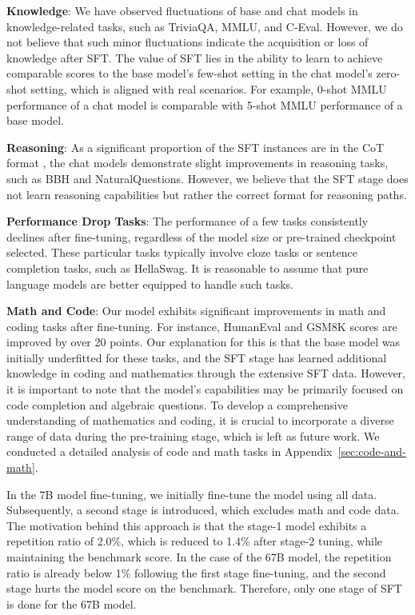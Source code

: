 \textbf{Knowledge}: We have observed fluctuations of base and chat models in knowledge-related tasks, such as TriviaQA, MMLU, and C-Eval. However, we do not believe that such minor fluctuations indicate the acquisition or loss of knowledge after SFT. The value of SFT lies in the ability to learn to achieve comparable scores to the base model's few-shot setting in the chat model's zero-shot setting, which is aligned with real scenarios. For example, 0-shot MMLU performance of a chat model is comparable with 5-shot MMLU performance of a base model. 

\textbf{Reasoning}: As a significant proportion of the SFT instances are in the CoT format \cite{cot}, the chat models demonstrate slight improvements in reasoning tasks, such as BBH and NaturalQuestions. However, we believe that the SFT stage does not learn reasoning capabilities but rather  the correct format for reasoning paths.

\textbf{Performance Drop Tasks}: The performance of a few tasks consistently declines after fine-tuning, regardless of the model size or pre-trained checkpoint selected. These particular tasks typically involve cloze tasks or sentence completion tasks, such as HellaSwag. It is reasonable to assume that pure language models are better equipped to handle such tasks.

\textbf{Math and Code}: Our model exhibits significant improvements in math and coding tasks after fine-tuning. For instance, HumanEval and GSM8K scores are improved by over 20 points. Our explanation for this is that the base model was initially underfitted for these tasks, and the SFT stage has learned additional knowledge in coding and mathematics through the extensive SFT data. However, it is important to note that the model's capabilities may be primarily focused on code completion and algebraic questions. To develop a comprehensive understanding of mathematics and coding, it is crucial to incorporate a diverse range of data during the pre-training stage, which is left as future work. We conducted a detailed analysis of code and math tasks in Appendix~\ref{sec:code-and-math}. 

In the 7B model fine-tuning, we initially fine-tune the model using all data. Subsequently, a second stage is introduced, which excludes math and code data. The motivation behind this approach is that the stage-1 model exhibits a repetition ratio of 2.0\%, which is reduced to 1.4\% after stage-2 tuning, while maintaining the benchmark score. In the case of the 67B model, the repetition ratio is already below 1\% following the first stage fine-tuning, and the second stage hurts the model score on the benchmark. Therefore, only one stage of SFT is done for the 67B model. 

